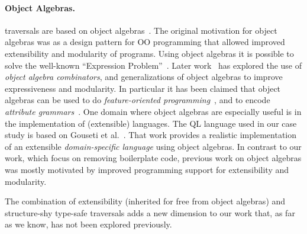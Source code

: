 \paragraph{Object Algebras.} \name traversals are based on
object algebras~\cite{bruno12oa}. The original motivation for object
algebras was as a design pattern for OO programming that allowed
improved extensibility and modularity of programs.  Using object
algebras it is possible to solve the well-known ``Expression
Problem''~\cite{wadler98expression-problem}.  Later
work~\cite{oliveira13fop,rendel14attributes} has explored the use of
\emph{object algebra combinators}, and generalizations of object
algebras to improve expressiveness and modularity. In particular it
has been claimed that object algebras can be used to do
\emph{feature-oriented programming}~\cite{oliveira13fop}, and to
encode \emph{attribute grammars}~\cite{rendel14attributes}. One domain
where object algebras are especially useful is in the implementation
of (extensible) languages.  The QL language used in our case study is
based on Gouseti et al.~\cite{gouseti14extensible}. That work
provides a realistic implementation of an extensible
\emph{domain-specific language} using object algebras. In contrast to
our work, which focus on removing boilerplate code, previous work on object algebras was mostly motivated by
improved programming support for extensibility and modularity. 
\begin{comment}
Our
work shows that object algebras are also useful to solve a different
problem: how to traverse complex structures without boilerplate
code. 
\end{comment}
The combination of extensibility (inherited for free from object
algebras) and structure-shy type-safe traversals  adds a new
dimension to our work that, as far as we know, has not been explored
previously.

